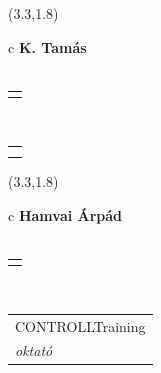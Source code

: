 \documentclass[11pt]{article}
\begin{document}
\makebox(3.3,1.8){
  \renewcommand\arraystretch{1.3}
  \begin{tabular}[c]{c}
    \hspace{8.5mm}
    \LARGE\bf{ K. Tamás }\\
    \hspace{8.5mm}
    \Large{  }\\
    \renewcommand\arraystretch{3}
    \begin{tabular}[c]{c}
      \centering
      \fontfamily{phv}\selectfont{
        \textbf{
          \textsc{
            \scriptsize{
            \color{Dark}{ Ismerkedő }\color{Bright}{ Webmester }\color{Bright}{ Sminkmester }\color{Bright}{ Programozó }
            }
          }
        }
      }
    \end{tabular}
    \\
    \renewcommand\arraystretch{1}
    \begin{tabular}{p{3.3in}}
      \hspace{.7cm}\\
      \hspace{.7cm}\emph{  }\\
    \end{tabular}
  \end{tabular}
}

\makebox(3.3,1.8){
  \renewcommand\arraystretch{1.3}
  \begin{tabular}[c]{c}
    \hspace{8.5mm}
    \LARGE\bf{ Hamvai Árpád }\\
    \hspace{8.5mm}
    \Large{  }\\
    \renewcommand\arraystretch{3}
    \begin{tabular}[c]{c}
      \centering
      \fontfamily{phv}\selectfont{
        \textbf{
          \textsc{
            \scriptsize{
            \color{Dark}{ Ismerkedő }\color{Bright}{ Webmester }\color{Bright}{ Sminkmester }\color{Bright}{ Programozó }
            }
          }
        }
      }
    \end{tabular}
    \\
    \renewcommand\arraystretch{1}
    \begin{tabular}{p{3.3in}}
      \hspace{.7cm}CONTROLLTraining\\
      \hspace{.7cm}\emph{ oktató }\\
    \end{tabular}
  \end{tabular}
}
\end{document}
